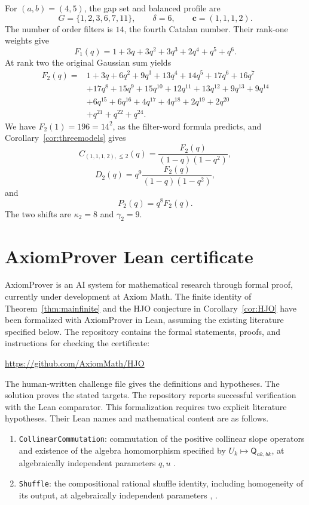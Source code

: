 \documentclass[12pt,reqno]{amsart}
\numberwithin{equation}{section}
\theoremstyle{definition}
\theoremstyle{remark}
\theoremstyle{plain}
\newcommand{\cc}{\mathbf c}
\newcommand{\Qop}{\mathsf Q}
\begin{document}
For $(a,b)=(4,5)$, the gap set and balanced profile are
\[
 G=\{1,2,3,6,7,11\},\qquad \delta=6,\qquad \cc=(1,1,1,2).
\]
The number of order filters is $14$, the fourth Catalan number. Their rank-one weights give
\[
 F_1(q)=1+3q+3q^2+3q^3+2q^4+q^5+q^6.
\]
At rank two the original Gaussian sum yields
\begin{align*}
 F_2(q)={}&1+3q+6q^2+9q^3+13q^4+14q^5+17q^6+16q^7\\
 &+17q^8+15q^9+15q^{10}+12q^{11}+13q^{12}+9q^{13}+9q^{14}\\
 &+6q^{15}+6q^{16}+4q^{17}+4q^{18}+2q^{19}+2q^{20}\\
 &+q^{21}+q^{22}+q^{24}.
\end{align*}
We have $F_2(1)=196=14^2$, as the filter-word formula predicts, and Corollary~\ref{cor:threemodels} gives
\[
 C_{(1,1,1,2),\le2}(q)=\frac{F_2(q)}{(1-q)(1-q^2)},
\]
\[
D_2(q)=q^9\frac{F_2(q)}{(1-q)(1-q^2)},
\]
and
\[ P_2(q)=q^8F_2(q).\]
The two shifts are $\kappa_2=8$ and $\gamma_2=9$. 




\section{AxiomProver Lean certificate}\label{sec:AxiomProver}

AxiomProver is an AI system for mathematical research through formal proof,
currently under development at Axiom Math. The finite identity of
Theorem~\ref{thm:mainfinite} and the HJO conjecture in
Corollary~\ref{cor:HJO} have been formalized with AxiomProver in Lean,
assuming the existing literature specified below. The repository contains
the formal statements, proofs, and instructions for checking the certificate:
\begin{center}
\url{https://github.com/AxiomMath/HJO}
\end{center}
The human-written challenge file gives the definitions and hypotheses.
The solution proves the stated targets. The repository reports
successful verification with the Lean comparator.
This formalization requires two explicit literature hypotheses.  Their
Lean names and mathematical content are as follows.
\begin{enumerate}


\item \texttt{CollinearCommutation}: commutation of the positive
collinear slope operators and existence of the algebra homomorphism
specified by $U_k\mapsto\Qop_{ak,bk}$, at algebraically independent
parameters $q,u$ \cite[Theorem~5.1 and Algorithm~3.1]{BGLX}.
\item \texttt{Shuffle}: the compositional rational shuffle identity,
including homogeneity of its output, at algebraically independent
parameters \cite[(3.7)]{BGLX}, \cite[Section~6]{Mellit}.
\end{enumerate}
\end{document}
